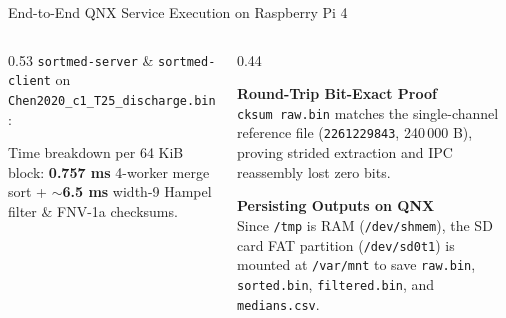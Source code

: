 \begin{frame}{End-to-End QNX Service Execution on Raspberry Pi 4}
  \begin{columns}[t, onlytextwidth]
    \begin{column}{0.53\textwidth}
      {\footnotesize \texttt{sortmed-server} \& \texttt{sortmed-client} on \texttt{Chen2020\_c1\_T25\_discharge.bin}:}
      \vskip1mm
      \begin{center}
      \end{center}
      \vskip1mm
      {\scriptsize Time breakdown per 64 KiB block: \textbf{0.757 ms} 4-worker merge sort + \textbf{$\sim$6.5 ms} width-9 Hampel filter \& FNV-1a checksums.}
    \end{column}
    \begin{column}{0.44\textwidth}
      \smalltext\compactitem
      \begin{highlight}
        \textbf{Round-Trip Bit-Exact Proof} \\
        \texttt{cksum raw.bin} matches the single-channel reference file (\texttt{2261229843}, 240\,000 B), proving strided extraction and IPC reassembly lost zero bits.
      \end{highlight}
      \vskip0.5mm
      \begin{tech}
        \textbf{Persisting Outputs on QNX} \\
        Since \texttt{/tmp} is RAM (\texttt{/dev/shmem}), the SD card FAT partition (\texttt{/dev/sd0t1}) is mounted at \texttt{/var/mnt} to save \texttt{raw.bin}, \texttt{sorted.bin}, \texttt{filtered.bin}, and \texttt{medians.csv}.
      \end{tech}
    \end{column}
  \end{columns}
\end{frame}

